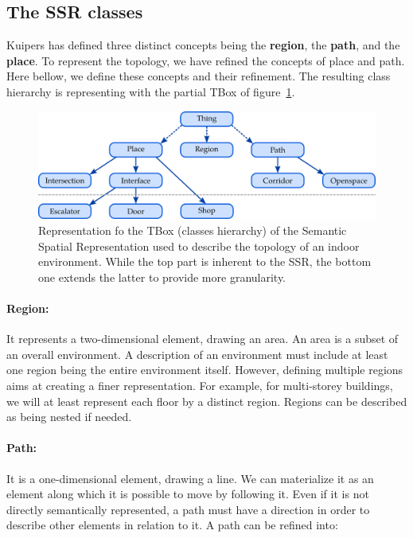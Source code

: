 \subsection{The SSR classes}

Kuipers has defined three distinct concepts being the \textbf{region}, the \textbf{path}, and the \textbf{place}. To represent the topology, we have refined the concepts of place and path. Here bellow, we define these concepts and their refinement. The resulting class hierarchy is representing with the partial TBox of figure~\ref{fig:chap3_tbox}.

\begin{figure}[ht!]
\centering
\includegraphics[scale=0.4]{figures/chapter3/ssr_tbox.png}
\caption{\label{fig:chap3_tbox} Representation fo the TBox (classes hierarchy) of the Semantic Spatial Representation used to describe the topology of an indoor environment. While the top part is inherent to the SSR, the bottom one extends the latter to provide more granularity.}
\end{figure}

\paragraph{Region:} It represents a two-dimensional element, drawing an area. An area is a subset of an overall environment. A description of an environment must include at least one region being the entire environment itself. However, defining multiple regions aims at creating a finer representation. For example, for multi-storey buildings, we will at least represent each floor by a distinct region. Regions can be described as being nested if needed.

\paragraph{Path:} It is a one-dimensional element, drawing a line. We can materialize it as an element along which it is possible to move by following it. Even if it is not directly semantically represented, a path must have a direction in order to describe other elements in relation to it. A path can be refined into:

